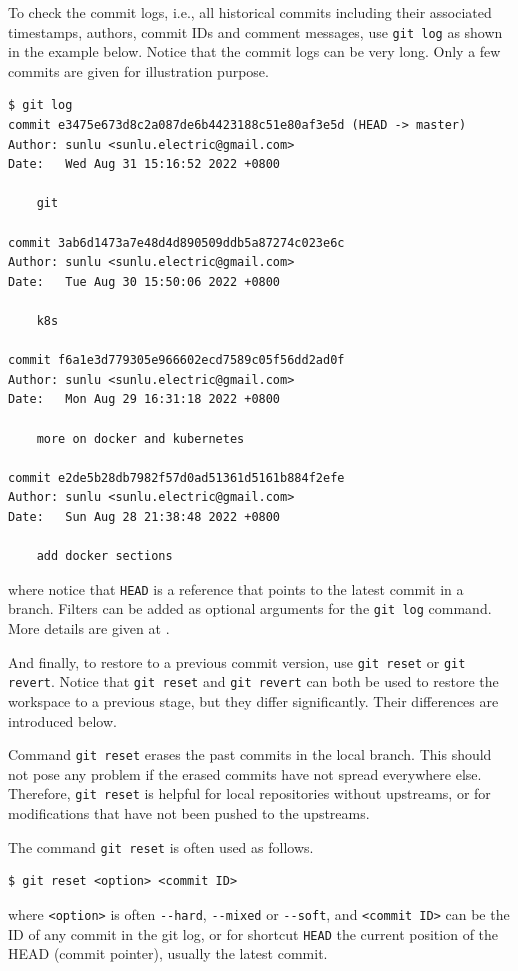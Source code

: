 To check the commit logs, i.e., all historical commits including their associated timestamps, authors, commit IDs and comment messages, use \verb|git log| as shown in the example below. Notice that the commit logs can be very long. Only a few commits are given for illustration purpose.
\begin{lstlisting}
$ git log
commit e3475e673d8c2a087de6b4423188c51e80af3e5d (HEAD -> master)
Author: sunlu <sunlu.electric@gmail.com>
Date:   Wed Aug 31 15:16:52 2022 +0800

    git

commit 3ab6d1473a7e48d4d890509ddb5a87274c023e6c
Author: sunlu <sunlu.electric@gmail.com>
Date:   Tue Aug 30 15:50:06 2022 +0800

    k8s

commit f6a1e3d779305e966602ecd7589c05f56dd2ad0f
Author: sunlu <sunlu.electric@gmail.com>
Date:   Mon Aug 29 16:31:18 2022 +0800

    more on docker and kubernetes

commit e2de5b28db7982f57d0ad51361d5161b884f2efe
Author: sunlu <sunlu.electric@gmail.com>
Date:   Sun Aug 28 21:38:48 2022 +0800

    add docker sections
\end{lstlisting}
where notice that \verb|HEAD| is a reference that points to the latest commit in a branch. Filters can be added as optional arguments for the \verb|git log| command. More details are given at \cite{git2025reference}.

And finally, to restore to a previous commit version, use \verb|git reset| or \verb|git revert|. Notice that \verb|git reset| and \verb|git revert| can both be used to restore the workspace to a previous stage, but they differ significantly. Their differences are introduced below.

Command \verb|git reset| erases the past commits in the local branch. This should not pose any problem if the erased commits have not spread everywhere else. Therefore, \verb|git reset| is helpful for local repositories without upstreams, or for modifications that have not been pushed to the upstreams. 

The command \verb|git reset| is often used as follows.
\begin{lstlisting}
$ git reset <option> <commit ID>
\end{lstlisting}
where \verb|<option>| is often \verb|--hard|, \verb|--mixed| or \verb|--soft|, and \verb|<commit ID>| can be the ID of any commit in the git log, or for shortcut \verb|HEAD| the current position of the HEAD (commit pointer), usually the latest commit.

